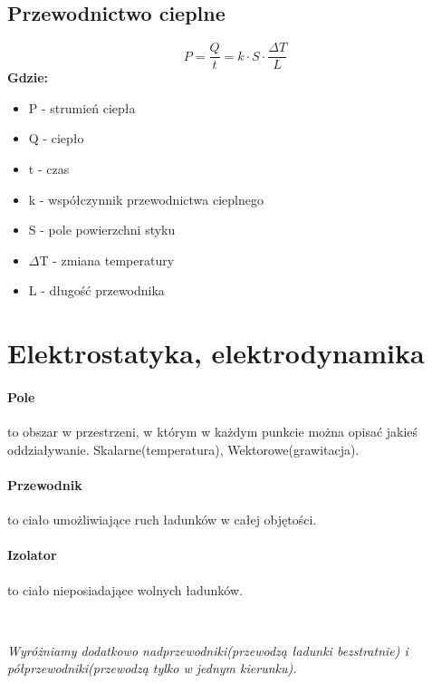 \documentclass{article}
\begin{document}
        \subsection{Przewodnictwo cieplne}
            \begin{equation}
                P = \frac{Q}{t} = k \cdotp S \cdotp \frac{\Delta T}{L}
            \end{equation}
            \textbf{Gdzie:}
                \begin{itemize}
                    \item P - strumień ciepła
                    \item Q - ciepło
                    \item t - czas
                    \item k - współczynnik przewodnictwa cieplnego
                    \item S - pole powierzchni styku
                    \item $\Delta$T - zmiana temperatury
                    \item L - długość przewodnika
                \end{itemize}

    \newpage
    \section{Elektrostatyka, elektrodynamika}
        \paragraph{Pole}
            to obszar w przestrzeni, w którym w każdym punkcie można
            opisać jakieś oddziaływanie.
            Skalarne(temperatura), Wektorowe(grawitacja).

        \paragraph{Przewodnik}
            to ciało umożliwiające ruch ładunków w całej objętości.

        \paragraph{Izolator}
            to ciało nieposiadające wolnych ładunków.
        

        \
        
        \textit{Wyróżniamy dodatkowo nadprzewodniki(przewodzą
        ładunki bezstratnie) i półprzewodniki(przewodzą
        tylko w jednym kierunku).}
\end{document}
